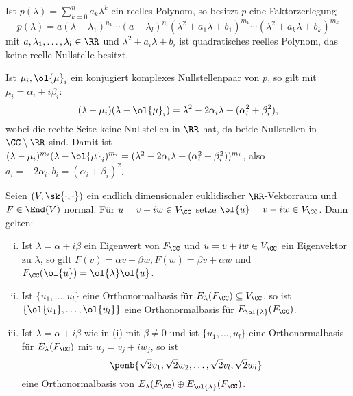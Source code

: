 \begin{korollar}
	\label{lemma:7.11}
	Ist $p(\lambda) = \sum_{k=0}^{n} a_k \lambda^k$ ein reelles Polynom, so besitzt $p$ eine Faktorzerlegung
	\[
		p(\lambda) = a(\lambda-\lambda_1)^{n_1} \cdots (a-\lambda_l)^{n_l} (\lambda^2 + a_1 \lambda + b_1)^{m_1} \cdots (\lambda^2 + a_k \lambda + b_k)^{m_k}
	\]
	mit $a,\lambda_1,\dots,\lambda_l \in \RR$ und $\lambda^2 + a_i \lambda + b_i$ ist quadratisches reelles Polynom, das keine reelle Nullstelle besitzt.
\end{korollar}

\begin{beweis}
	Ist $\mu_i, \ol{\mu}_i$ ein konjugiert komplexes Nullstellenpaar von $p$, so gilt mit $\mu_i = \alpha_i + i \beta_i$:
	\[
		(\lambda - \mu_i)(\lambda - \ol{\mu}_i) = \lambda^2 - 2 \alpha_i \lambda + (\alpha_i^2 + \beta_i^2),
	\]
	wobei die rechte Seite keine Nullstellen in $\RR$ hat, da beide Nullstellen in $\CC \setminus \RR$ sind.
	Damit ist $(\lambda - \mu_i)^{m_i} (\lambda - \ol{\mu}_i)^{m_i} = (\lambda^2 - 2 \alpha_i \lambda + (\alpha_i^2 + \beta_i^2))^{m_i}$, also $a_i = -2\alpha_i, b_i = (\alpha_i + \beta_i)^2$. 
\end{beweis}

\begin{lemma}
	\label{lemma:7.12}
	Seien $(V,\sk{\cdot,\cdot})$ ein endlich dimensionaler euklidischer $\RR$-Vektorraum und $F \in \End(V)$ normal.
	Für $u = v + iw \in V_{\CC}$ setze $\ol{u} = v - iw \in V_{\CC}$.
	Dann gelten:
	\begin{enumerate}[(i)]
		\item Ist $\lambda = \alpha + i \beta$ ein Eigenwert von $F_{\CC}$ und $u = v+iw \in V_{\CC}$ ein Eigenvektor zu $\lambda$, so gilt $F(v) = \alpha v - \beta w, F(w) = \beta v + \alpha w$ und $F_{\CC}(\ol{u}) = \ol{\lambda} \ol{u}$.
		\item Ist $\{u_1,\dots,u_l\}$ eine Orthonormalbasis für $E_\lambda(F_{\CC}) \subseteq V_{\CC}$, so ist $\{\ol{u_1},\dots,\ol{u_l}\}$ eine Orthonormalbasis für $E_{\ol{\lambda}}(F_{\CC})$.
		\item Ist $\lambda = \alpha + i\beta$ wie in (i) mit $\beta \neq 0$ und ist $\{u_1,\dots,u_l\}$ eine Orthonormalbasis für $E_\lambda(F_{\CC})$ mit $u_j = v_j + iw_j$, so ist
		\[
			\penb{\sqrt{2} v_1, \sqrt{2} w_2, \dots, \sqrt{2} v_l,\sqrt{2} w_l}
		\]
		eine Orthonormalbasis von $E_{\lambda}(F_{\CC}) \oplus E_{\ol{\lambda}}(F_{\CC})$.
	\end{enumerate}
\end{lemma}

